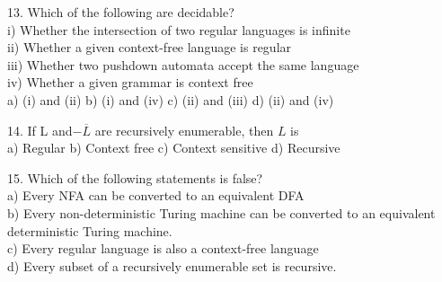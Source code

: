 \documentclass[11pt]{article}
\begin{document}
\hspace*{-0.4cm}
13. Which of the following are decidable?\\
\hspace*{0.5cm} i) Whether the intersection of two regular languages is infinite\\
\hspace*{0.5cm} ii) Whether a given context-free language is regular\\
\hspace*{0.5cm} iii) Whether two pushdown automata accept the same language\\
\hspace*{0.5cm} iv) Whether a given grammar is context free\\
\hspace*{0.5cm} a) (i) and (ii)   \hspace*{0.5cm}   b) (i) and (iv)   \hspace*{0.5cm}   c) (ii) and (iii)  \hspace*{0.5cm}   d) (ii) and (iv)\\
\vspace*{0.2cm}

\hspace*{-0.4cm}
14. If L and$-\overline{L}$ are recursively enumerable, then $L$ is\\
\hspace*{0.5cm} a) Regular    \hspace*{0.5cm}  b) Context free    \hspace*{0.5cm}  c) Context sensitive    \hspace*{0.5cm}  d) Recursive\\
\vspace*{0.2cm}

\hspace*{-0.4cm}
15. Which of the following statements is false?\\
\hspace*{0.5cm} a) Every NFA can be converted to an equivalent DFA\\
\hspace*{0.5cm} b) Every non-deterministic Turing machine can be converted to an equivalent deterministic
Turing machine.\\
\hspace*{0.5cm} c) Every regular language is also a context-free language\\
\hspace*{0.5cm} d) Every subset of a recursively enumerable set is recursive.\\
\vspace*{0.2cm}
\end{document}

